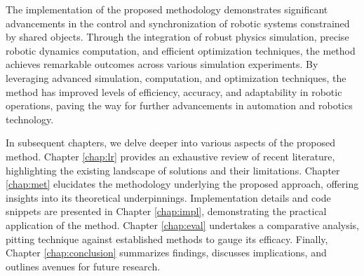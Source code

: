 The implementation of the proposed methodology demonstrates significant advancements 
in the control and synchronization of robotic systems constrained by shared objects. 
Through the integration of robust physics simulation, precise robotic dynamics 
computation, and efficient optimization techniques, the method achieves remarkable 
outcomes across various simulation experiments. By leveraging 
advanced simulation, computation, and optimization techniques, the method has 
improved levels of efficiency, accuracy, and adaptability in robotic operations, 
paving the way for further advancements in automation and robotics technology.

In subsequent chapters, we delve deeper into various aspects of the proposed method. 
Chapter \ref{chap:lr} provides an exhaustive review of recent literature, 
highlighting the existing landscape of solutions and their limitations. 
Chapter \ref{chap:met} elucidates the methodology underlying the proposed approach, 
offering insights into its theoretical underpinnings. Implementation details and 
code snippets are presented in Chapter \ref{chap:impl}, demonstrating the practical 
application of the method. Chapter \ref{chap:eval} undertakes a comparative 
analysis, pitting technique against established methods to gauge its efficacy. 
Finally, Chapter \ref{chap:conclusion} summarizes findings, discusses 
implications, and outlines avenues for future research.
